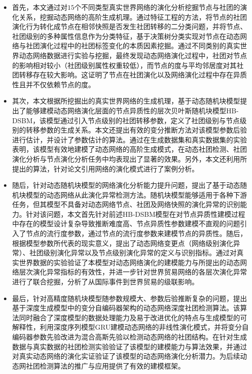 \begin{itemize}
	\item 首先，本文通过对$15$个不同类型真实世界网络的演化分析挖掘节点与社团的演化关系，挖掘动态网络的高阶生成机理。通过特征工程的方法，将节点的社团演化行为转化成节点在相邻快照是否发生社团转移的二分类问题，并将节点、社团级别的多种属性信息作为分类特征，基于决策树分类实现对节点在动态网络与社团演化过程中的社团标签变化的本质因素挖掘。通过不同类别的真实世界动态网络数据进行实验与挖掘，最终发现动态网络演化过程中，社团对节点的影响相对较小（社团级别属性权重较低），而节点的度与平均邻居度对其社团转移存在较大影响。这证明了节点在社团演化以及网络演化过程中存在异质性且并不仅依赖节点的度。
	

	
	\item 其次，本文根据所挖掘出的真实世界网络的生成机理，基于动态随机块模型提出了能够建模动态网络演化层面的节点异质性的层次贝叶斯随机块模型HB-DSBM，该模型通过引入节点级别的社团转移参数，定义了社团级别与节点级别的转移参数的生成关系。本文还提出有效的变分推断方法对该模型参数后验进行估计，并设计了参数估计的算法。通过在生成数据集和真实数据集的实验表明，该模型有效地建模了动态网络的高阶生成模式，在动态社团检测、社团演化分析与节点演化分析任务中均表现出了显著的效果。另外，本文还利用所提出的算法，针对论文引用网络的演化模式进行了案例分析。
	
	\item 随后，针对动态随机块模型的网络演化分析能力提升问题，提出了基于动态随机块模型的动态网络从此演化异常检测方法。随机块模型能够适用于各种下游任务，但其模型不具备对动态网络节点、社团及网络快照的演化异常的识别能力。针对该问题，本文首先针对前述HB-DSBM模型在对节点异质性建模过程中存在的模型设计复杂导致推断难度高、节点异质性参数建模不直观的问题引入了节点的流行度参数，通过节点的流行度参数来建模节点的异质性。随后，根据模型参数所代表的现实意义，提出了动态网络变更点（网络级别演化异常）、社团级别演化异常以及节点级别演化异常的定义与识别指标。通过对真实世界数据的实验验证了本模型对动态网络演化的建模能力与所提出的动态网络层次演化异常指标的有效性，并进一步针对世界贸易网络的各层次演化异常进行了联合挖掘，分析了从国际事件到世界贸易的级联影响。
	
	
	\item 最后，针对高精度随机块模型随参数规模大、参数后验推断复杂的问题，提出基于深度生成模型中的变分自编码器架构的动态网络深度社团检测算法。该算法同时融合了深度模型的数据处理能力及易于改进优化的特点与生成模型的可解释性，利用深度序列模型GRU建模动态网络的非线性演化模式，并将变分自编码器参数先验改进为混合高斯先验以检测动态网络的社团结构。在针对生成数据与真实数据的社团检测实验验证了该模型的建模能力与算法效果，并通过对真实动态网络的演化实证验证了该模型的动态网络演化分析潜力。为后续动态网社团检测算法的推广与应用提供了有效的建模框架。
\end{itemize}




